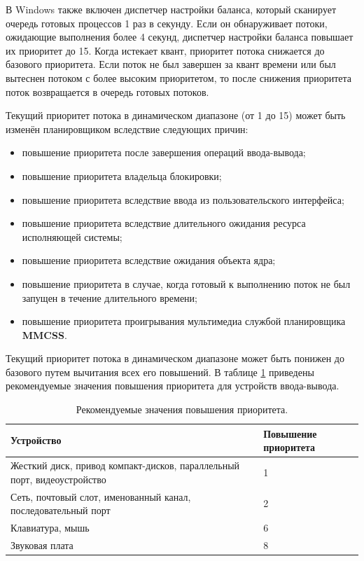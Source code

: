 \documentclass[a4paper,14pt]{extarticle}
\begin{document}
В Windows также включен диспетчер настройки баланса, который сканирует очередь готовых процессов 1 раз в секунду. 
Если он обнаруживает потоки, ожидающие выполнения более 4
секунд, диспетчер настройки баланса повышает их приоритет до 15. Когда истекает
квант, приоритет потока снижается до базового приоритета. Если поток не был завершен за квант времени или был вытеснен потоком с более высоким приоритетом, то
после снижения приоритета поток возвращается в очередь готовых потоков.

Текущий приоритет потока в динамическом диапазоне (от 1 до 15) может быть изменён планировщиком вследствие следующих причин:
\begin{itemize}
    \item повышение приоритета после завершения операций ввода-вывода;
    \item повышение приоритета владельца блокировки;
    \item повышение приоритета вследствие ввода из пользовательского интерфейса;
    \item повышение приоритета вследствие длительного ожидания ресурса исполняющей системы;
    \item повышение приоритета вследствие ожидания объекта ядра;
    \item повышение приоритета в случае, когда готовый к выполнению поток не был запущен в течение длительного времени;
    \item повышение приоритета проигрывания мультимедиа службой планировщика \textbf{MMCSS}.
\end{itemize}

Текущий приоритет потока в динамическом диапазоне может быть понижен до базового путем вычитания всех его повышений. В таблице \ref{tab:io} 
приведены рекомендуемые значения повышения приоритета для устройств ввода-вывода.

\begin{table}[h!]
    \caption{Рекомендуемые значения повышения приоритета.}
    \begin{center}
        \begin{tabular}{|p{100mm}|l|}
            \hline
            \textbf{Устройство} & \textbf{Повышение приоритета} \\
            \hline
            Жесткий диск, привод компакт-дисков, параллельный порт, видеоустройство & 1 \\
            \hline
            Сеть, почтовый слот, именованный канал, последовательный порт & 2 \\
            \hline
            Клавиатура, мышь & 6 \\
            \hline
            Звуковая плата & 8 \\
            \hline
        \end{tabular}
    \end{center}
    \label{tab:io}
\end{table}
\end{document}
